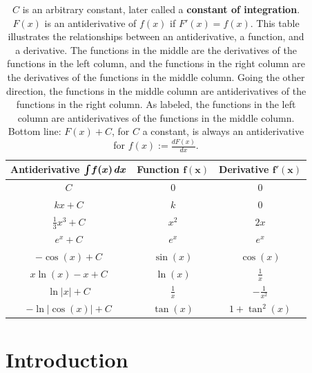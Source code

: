 \vspace*{2cm}

\renewcommand{\arraystretch}{1.5}  %


\begin{table}[ht!]
\centering
\begin{tabular}{|c|c|c|}
\hline
{\bf Antiderivative \(  \boldint \bm{f(x) \, dx }\)} & {\bf Function \( \bm{f(x)} \) }& {\bf Derivative \( \bm{f'(x)} \) }\\
\hline \hline
\( C \) & \( 0 \) & \( 0 \) \\ \hline
\( kx + C \) & \( k\) & \( 0 \) \\ \hline
\( \frac{1}{3}x^3 + C \) & \( x^2 \) & \( 2x \) \\ \hline
\( e^x + C \) & \( e^x \) & \( e^x \) \\ \hline
\( -\cos(x) + C \) & \( \sin(x) \) & \( \cos(x) \) \\ \hline
\( x\ln(x) - x + C \) & \( \ln(x) \) & \( \frac{1}{x} \) \\ \hline
\( \ln|x| + C \) & \( \frac{1}{x} \) & \( -\frac{1}{x^2} \) \\ \hline
\( -\ln|\cos(x)| + C \) & \( \tan(x) \) & \( 1 + \tan^2(x) \) \\ 
\hline
\end{tabular}
\caption{$C$ is an arbitrary constant, later called a \textbf{constant of integration}. $F(x)$ is an antiderivative of $f(x)$ if $F'(x) = f(x)$. This table illustrates the relationships between an antiderivative, a function, and a derivative. The functions in the middle are the derivatives of the functions in the left column, and the functions in the right column are the derivatives of the functions in the middle column. Going the other direction, the functions in the middle column are antiderivatives of the functions in the right column. As labeled, the functions in the left column are antiderivatives of the functions in the middle column. Bottom line: $F(x) + C$, for $C$ a constant, is always an antiderivative for $f(x):=\frac{dF(x)}{dx}$.}
\label{tab:antideriv-func-deriv}
\end{table}




\section{Introduction} 

